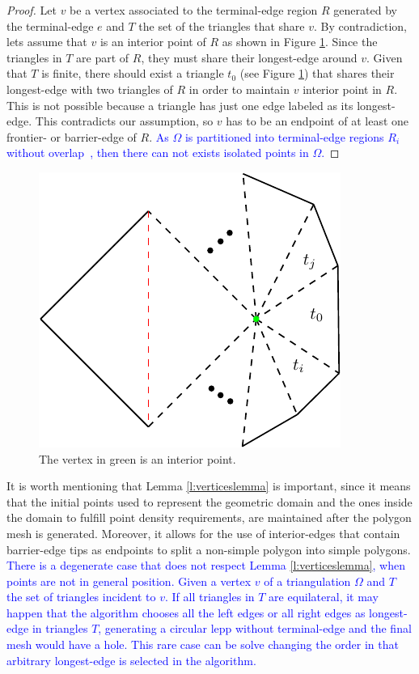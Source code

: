 \documentclass[pdflatex,sn-mathphys]{sn-jnl}%
\theoremstyle{thmstyleone}%
\theoremstyle{thmstyletwo}%
\theoremstyle{thmstylethree}%
\begin{document}
\begin{proof} Let $v$ be  a vertex  associated to the terminal-edge region $R$ generated by the terminal-edge $e$ and  $T$ the set of the triangles that share $v$. By contradiction, lets assume that $v$ is an interior point of $R$ as shown  in Figure \ref{fig:lemmaquitadomingos}. Since the triangles in $T$ are part of $R$, they must share their longest-edge around $v$. 
Given that $T$ is finite, there should exist a triangle $t_0$ (see Figure \ref{fig:lemmaquitadomingos}) that shares their longest-edge with two triangles of $R$ in order to maintain $v$ interior point in $R$. This is not possible because a triangle has just one edge labeled as its  longest-edge. This contradicts our assumption, so $v$ has to be an endpoint of  at least one frontier- or barrier-edge of $R$. \textcolor{blue}{ As $\Omega$ is partitioned into terminal-edge regions $R_i$ without overlap~\cite{Ojeda2018ANA}, then there can not exists isolated points in $\Omega$.}
\end{proof}

\begin{figure}[h]
\centering
\includegraphics[width=0.25\linewidth]{demostracionlemma2.1} 
\caption{The  vertex in green is an interior point.}
\label{fig:lemmaquitadomingos}    
\end{figure}


It is worth mentioning that Lemma \ref{l:verticeslemma} is important, since it means that the initial points used to represent the geometric domain and the ones inside the domain to fulfill point density requirements, are maintained after the polygon mesh is generated. Moreover, it allows for the use of interior-edges that contain barrier-edge tips as endpoints to split a non-simple polygon into simple polygons.
\newpage
\textcolor{blue}{There is a degenerate case that does not respect Lemma \ref{l:verticeslemma}, when points are not in general position. Given a vertex $v$ of a triangulation $\Omega$ and $T$ the set of triangles incident to $v$. If all triangles in $T$ are equilateral, it may happen that the algorithm chooses all the left edges or all right edges as longest-edge in triangles $T$, generating a circular lepp without terminal-edge and the final mesh would have a hole. This rare case can be solve changing the order in that arbitrary longest-edge is selected in the algorithm.}
\end{document}
